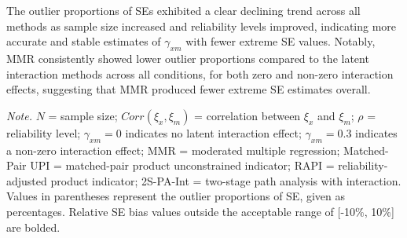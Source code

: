 \documentclass[
  man]{apa6}
\newenvironment{lltable}{\begin{landscape}\centering\begin{ThreePartTable}}{\end{ThreePartTable}\end{landscape}}
\begin{document}
The outlier proportions of SEs exhibited a clear declining trend across all methods as sample size increased and reliability levels improved, indicating more accurate and stable estimates of \(\gamma_{xm}\) with fewer extreme SE values. Notably, MMR consistently showed lower outlier proportions compared to the latent interaction methods across all conditions, for both zero and non-zero interaction effects, suggesting that MMR produced fewer extreme SE estimates overall.

\begin{lltable}

\begin{TableNotes}[para]
\normalsize{\textit{Note.} $\textit{N}$ = sample size; $Corr(\xi_{x}, \xi_{m})$ = correlation between $\xi_{x}$ and $\xi_{m}$; $\rho$ = reliability level; $\gamma_{xm} = 0$ indicates no latent interaction effect; $\gamma_{xm} = 0.3$ indicates a non-zero interaction effect; MMR = moderated multiple regression; Matched-Pair UPI = matched-pair product unconstrained indicator; RAPI = reliability-adjusted product indicator; 2S-PA-Int = two-stage path analysis with interaction. Values in parentheses represent the outlier proportions of SE, given as percentages. Relative SE bias values outside the acceptable range of [-10$\%$, 10$\%$] are bolded.}
\end{TableNotes}

\tiny{

}
\end{lltable}
\end{document}
